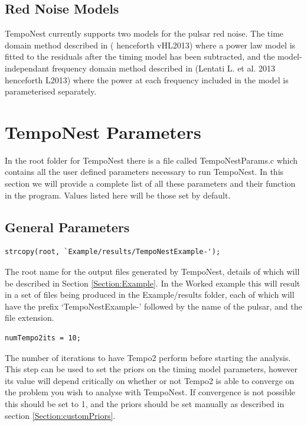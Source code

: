 \documentclass[%
 preprint,
 amsmath,amssymb,amsfonts,
 aps,
]{revtex4-1}
\begin{document}
\subsection{Red Noise Models}

TempoNest currently supports two models for the pulsar red noise.  The time domain method described in (\cite{2012arXiv1202.5932V} henceforth vHL2013) where a power law model is fitted to the residuals after the timing model has been subtracted, and the model-independant frequency domain method described in (Lentati L. et al. 2013 henceforth L2013) where the power at each frequency included in the model is parameterised separately.


\section{TempoNest Parameters}
\label{Section:params}

In the root folder for TempoNest there is a file called TempoNestParams.c which contains all the user defined parameters necessary to run TempoNest.  In this section we will provide a complete list of all these parameters and their function in the program.  Values listed here will be those set by default.

\subsection{General Parameters}

%
\begin{lstlisting}
strcopy(root, `Example/results/TempoNestExample-');
\end{lstlisting}
%
The root name for the output files generated by TempoNest, details of which will be described in Section \ref{Section:Example}.  In the Worked example this will result in a set of files being produced in the Example/results folder, each of which will have the prefix `TempoNestExample-' followed by the name of the pulsar, and the file extension.



\begin{lstlisting}
numTempo2its = 10;
\end{lstlisting}
%
The number of iterations to have Tempo2 perform before starting the analysis.  This step can be used to set the priors on the timing model parameters, however its value will depend critically on whether or not Tempo2 is able to converge on the problem you wish to analyse with TempoNest.  If convergence is not possible this should be set to 1, and the priors should be set manually as described in section \ref{Section:customPriors}.
\end{document}
